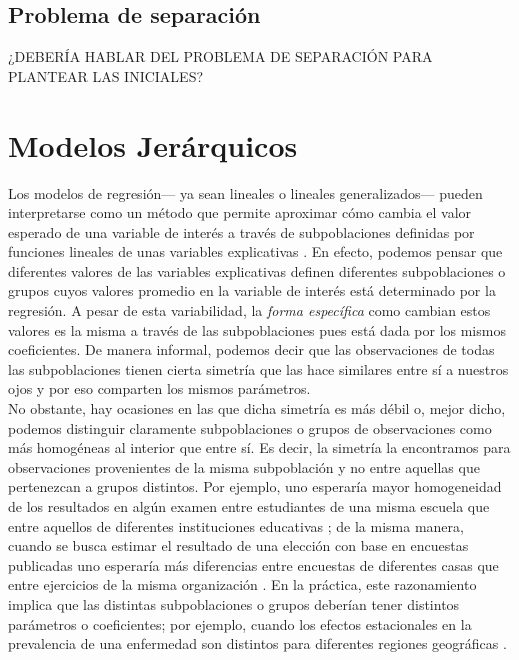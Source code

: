 \subsection{Problema de separación}

{\color{Red} ¿DEBERÍA HABLAR DEL PROBLEMA DE SEPARACIÓN PARA PLANTEAR LAS INICIALES?}

\section{Modelos Jerárquicos}

Los modelos de regresión--- ya sean lineales o lineales generalizados--- pueden interpretarse como un método que permite aproximar cómo cambia el valor esperado de una variable de interés a través de subpoblaciones definidas por funciones lineales de unas variables explicativas \parencite[31]{GelmanHill06}. En efecto, podemos pensar que diferentes valores de las variables explicativas definen diferentes subpoblaciones o grupos cuyos valores promedio en la variable de interés está determinado por la regresión. A pesar de esta variabilidad, la \textit{forma específica} como cambian estos valores es la misma a través de las subpoblaciones pues está dada por los mismos coeficientes. De manera informal, podemos decir que las observaciones de todas las subpoblaciones tienen cierta simetría que las hace similares entre sí a nuestros ojos y por eso comparten los mismos parámetros.\\ 

No obstante, hay ocasiones en las que dicha simetría es más débil o, mejor dicho, podemos distinguir claramente subpoblaciones o grupos de observaciones como más homogéneas al interior que entre sí. Es decir, la simetría la encontramos para observaciones provenientes de la misma subpoblación y no entre aquellas que pertenezcan a grupos distintos. Por ejemplo, uno esperaría mayor homogeneidad de los resultados en algún examen entre estudiantes de una misma escuela que entre aquellos de diferentes instituciones educativas \parencite{Ortiz12}; de la misma manera, cuando se busca estimar el resultado de una elección con base en encuestas publicadas uno esperaría más diferencias entre encuestas de diferentes casas que entre ejercicios de la misma organización \parencite{Zepeda18}. En la práctica, este razonamiento implica que las distintas subpoblaciones o grupos deberían tener distintos parámetros o coeficientes; por ejemplo, cuando los efectos estacionales en la prevalencia de una enfermedad son distintos para diferentes regiones geográficas \parencite{Usi14}.\\ 


